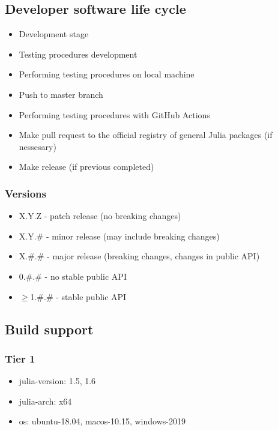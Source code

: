 \documentclass[12pt,a4paper]{article}
\begin{document}
\subsection{Developer software life cycle}
\begin{itemize}
\item Development stage


\item Testing procedures development


\item Performing testing procedures on local machine


\item Push to master branch


\item Performing testing procedures with GitHub Actions


\item Make pull request to the official registry of general Julia packages (if nessesary)


\item Make release (if previous completed)

\end{itemize}
\subsubsection{Versions}
\begin{itemize}
\item X.Y.Z - patch release (no breaking changes)


\item X.Y.\# - minor release (may include breaking changes)


\item X.\#.\# - major release (breaking changes, changes in public API)


\item 0.\#.\# - no stable public API


\item \ensuremath{\geq}1.\#.\# - stable public API

\end{itemize}
\subsection{Build support}
\subsubsection{Tier 1}
\begin{itemize}
\item julia-version: 1.5, 1.6


\item julia-arch: x64


\item os: ubuntu-18.04, macos-10.15, windows-2019

\end{itemize}
\end{document}
